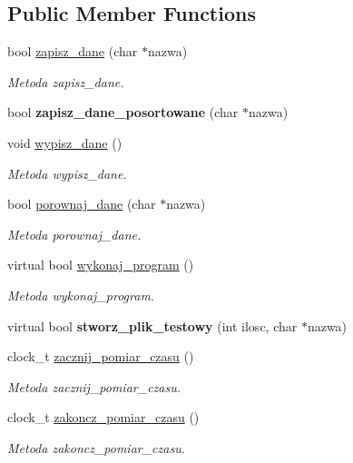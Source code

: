 \subsection*{Public Member Functions}
\begin{DoxyCompactItemize}
\item 
bool \hyperlink{class_program_aaef7fcaf64830eb231cbb9e887d705af}{zapisz\-\_\-dane} (char $\ast$nazwa)
\begin{DoxyCompactList}\small\item\em Metoda zapisz\-\_\-dane. \end{DoxyCompactList}\item 
\hypertarget{class_program_a320c378a3507881d2d62bbd0c8ea07d9}{bool {\bfseries zapisz\-\_\-dane\-\_\-posortowane} (char $\ast$nazwa)}\label{class_program_a320c378a3507881d2d62bbd0c8ea07d9}

\item 
void \hyperlink{class_program_a060ea3afebf696152d50135d20856e5a}{wypisz\-\_\-dane} ()
\begin{DoxyCompactList}\small\item\em Metoda wypisz\-\_\-dane. \end{DoxyCompactList}\item 
bool \hyperlink{class_program_ab5441e0e8ecd02ffeada4d77aaad2726}{porownaj\-\_\-dane} (char $\ast$nazwa)
\begin{DoxyCompactList}\small\item\em Metoda porownaj\-\_\-dane. \end{DoxyCompactList}\item 
virtual bool \hyperlink{class_program_ac396401ba5cade863d0e6acb727bec4e}{wykonaj\-\_\-program} ()
\begin{DoxyCompactList}\small\item\em Metoda wykonaj\-\_\-program. \end{DoxyCompactList}\item 
\hypertarget{class_program_a7fa8a33fb88f842b544e6d65c23022c3}{virtual bool {\bfseries stworz\-\_\-plik\-\_\-testowy} (int ilosc, char $\ast$nazwa)}\label{class_program_a7fa8a33fb88f842b544e6d65c23022c3}

\item 
clock\-\_\-t \hyperlink{class_program_ab68c69977637eb8cc05a57e176a21986}{zacznij\-\_\-pomiar\-\_\-czasu} ()
\begin{DoxyCompactList}\small\item\em Metoda zacznij\-\_\-pomiar\-\_\-czasu. \end{DoxyCompactList}\item 
clock\-\_\-t \hyperlink{class_program_a3515568f8df7224bfd8fd8b7b76ab0ba}{zakoncz\-\_\-pomiar\-\_\-czasu} ()
\begin{DoxyCompactList}\small\item\em Metoda zakoncz\-\_\-pomiar\-\_\-czasu. \end{DoxyCompactList}\end{DoxyCompactItemize}
